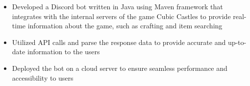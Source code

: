 \documentclass[10pt,a4paper,ragged2e]{altacv}
\begin{document}
\divider

\begin{itemize}
\item Developed a Discord bot written in Java using Maven framework that integrates with the internal servers of the game Cubic Castles to provide real-time information about the game, such as crafting and item searching
\item Utilized API calls and parse the response data to provide accurate and up-to-date information to the users
\item Deployed the bot on a cloud server to ensure seamless performance and accessibility to users
\end{itemize}

\clearpage

% 
% 
% 
% 
% 
% 
% 
\end{document}
